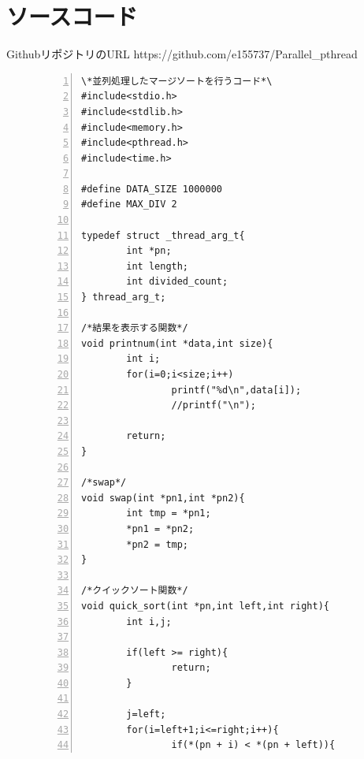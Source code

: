 \documentclass[11pt,a4paper]{jsarticle}
\begin{document}
\newpage
\section*{ソースコード}
GithubリポジトリのURL https://github.com/e155737/Parallel\_pthread
\begin{figure}[htbp]
 \begin{center}
  \begin{Verbatim}[frame=single,baselinestretch=1,fontsize=\footnotesize,numbers=left]
\*並列処理したマージソートを行うコード*\
#include<stdio.h>
#include<stdlib.h>
#include<memory.h>
#include<pthread.h>
#include<time.h>

#define DATA_SIZE 1000000
#define MAX_DIV 2

typedef struct _thread_arg_t{
		int *pn;
		int length;
		int divided_count;
} thread_arg_t;

/*結果を表示する関数*/
void printnum(int *data,int size){
		int i;
		for(i=0;i<size;i++)
				printf("%d\n",data[i]);
				//printf("\n");

		return;
}

/*swap*/
void swap(int *pn1,int *pn2){
		int tmp = *pn1;
		*pn1 = *pn2;
		*pn2 = tmp;
}

/*クイックソート関数*/
void quick_sort(int *pn,int left,int right){
		int i,j;

		if(left >= right){
				return;
		}

		j=left;
		for(i=left+1;i<=right;i++){
				if(*(pn + i) < *(pn + left)){
  \end{Verbatim}
 \end{center}
\end{figure}
\end{document}
